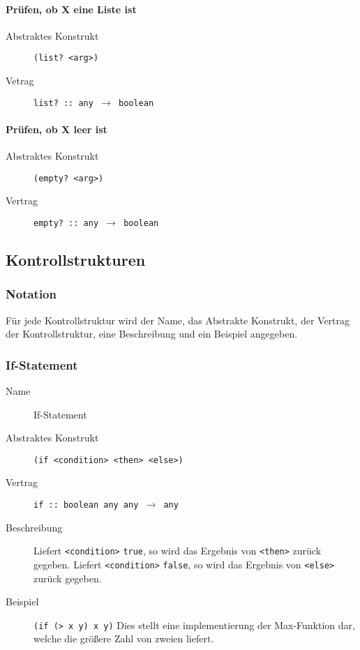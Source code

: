 \paragraph{Prüfen, ob X eine Liste ist}
\begin{description}
	\item[Abstraktes Konstrukt] \texttt{(list? <arg>)}
	\item[Vetrag] \texttt{list? :: any $ \rightarrow $ boolean}
\end{description}

\paragraph{Prüfen, ob X leer ist}
\begin{description}
	\item[Abstraktes Konstrukt] \texttt{(empty? <arg>)}
	\item[Vertrag] \texttt{empty? :: any $ \rightarrow $ boolean}
\end{description}



\subsection{Kontrollstrukturen}
\subsubsection{Notation}
Für jede Kontrollstruktur wird der Name, das Abstrakte Konstrukt, der Vertrag der Kontrollstruktur, eine Beschreibung und ein Beispiel angegeben.


\subsubsection{If-Statement}
\label{racket:if}
\begin{description}
	\item[Name] If-Statement
	\item[Abstraktes Konstrukt] \texttt{(if <condition> <then> <else>)}
	\item[Vertrag] \texttt{if :: boolean any any $ \rightarrow $ any}
	\item[Beschreibung] Liefert \texttt{<condition>} \texttt{true}, so wird das Ergebnis von \texttt{<then>} zurück gegeben. Liefert \texttt{<condition>} \texttt{false}, so wird das Ergebnis von \texttt{<else>} zurück gegeben.
	\item[Beispiel] \texttt{(if (> x y) x y)} Dies stellt eine implementierung der Max-Funktion dar, welche die größere Zahl von zweien liefert.
\end{description}


